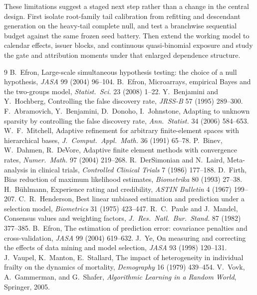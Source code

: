 \documentclass[11pt]{article}
\begin{document}
These limitations suggest a staged next step rather than a change in the central design.  First isolate
root-family tail calibration from refitting and descendant generation on the heavy-tail complete null,
and test a branchwise sequential budget against the same frozen seed battery.  Then extend the working
model to calendar effects, issuer blocks, and continuous quasi-binomial exposure and study the gate and
attribution moments under that enlarged dependence structure.

\begin{thebibliography}{9}\small
{} B.~Efron, Large-scale simultaneous hypothesis testing: the choice
of a null hypothesis, \emph{JASA} 99 (2004) 96--104.
 B.~Efron, Microarrays, empirical Bayes and the two-groups model,
\emph{Statist.\ Sci.} 23 (2008) 1--22.
 Y.~Benjamini and Y.~Hochberg, Controlling the false discovery rate,
\emph{JRSS-B} 57 (1995) 289--300.
 F.~Abramovich, Y.~Benjamini, D.~Donoho, I.~Johnstone, Adapting
to unknown sparsity by controlling the false discovery rate, \emph{Ann.\ Statist.} 34
(2006) 584--653.
 W.~F.~Mitchell, Adaptive refinement for arbitrary finite-element
spaces with hierarchical bases, \emph{J.\ Comput.\ Appl.\ Math.} 36 (1991) 65--78.
 P.~Binev, W.~Dahmen, R.~DeVore, Adaptive finite element methods
with convergence rates, \emph{Numer.\ Math.} 97 (2004) 219--268.
 R.~DerSimonian and N.~Laird, Meta-analysis in clinical trials,
\emph{Controlled Clinical Trials} 7 (1986) 177--188.
 D.~Firth, Bias reduction of maximum likelihood estimates,
\emph{Biometrika} 80 (1993) 27--38.
 H.~B\"uhlmann, Experience rating and credibility,
\emph{ASTIN Bulletin} 4 (1967) 199--207.
 C.~R.~Henderson, Best linear unbiased estimation and
prediction under a selection model, \emph{Biometrics} 31 (1975) 423--447.
 R.~C.~Paule and J.~Mandel, Consensus values and weighting factors,
\emph{J.\ Res.\ Natl.\ Bur.\ Stand.} 87 (1982) 377--385.
 B.~Efron, The estimation of prediction error: covariance
penalties and cross-validation, \emph{JASA} 99 (2004) 619--632.
 J.~Ye, On measuring and correcting the effects of data mining and
model selection, \emph{JASA} 93 (1998) 120--131.
 J.~Vaupel, K.~Manton, E.~Stallard, The impact of heterogeneity in
individual frailty on the dynamics of mortality, \emph{Demography} 16 (1979) 439--454.
 V.~Vovk, A.~Gammerman, and G.~Shafer, \emph{Algorithmic Learning in a Random
World}, Springer, 2005.
\end{thebibliography}
\end{document}
